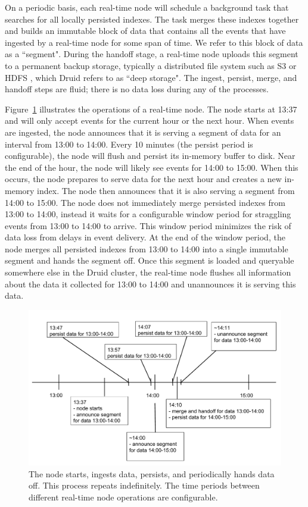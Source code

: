 \documentclass{sig-alternate-2013}
\begin{document}
On a periodic basis, each real-time node will schedule a background task that
searches for all locally persisted indexes. The task merges these indexes
together and builds an immutable block of data that contains all the events
that have ingested by a real-time node for some span of time. We refer to this
block of data as a ``segment". During the handoff stage, a real-time node
uploads this segment to a permanent backup storage, typically a distributed
file system such as S3 \cite{decandia2007dynamo} or HDFS
\cite{shvachko2010hadoop}, which Druid refers to as ``deep storage". The ingest,
persist, merge, and handoff steps are fluid; there is no data loss during any
of the processes.

Figure~\ref{fig:realtime_timeline} illustrates the operations of a real-time
node. The node starts at 13:37 and will only accept events for the current hour
or the next hour. When events are ingested, the node announces that it is
serving a segment of data for an interval from 13:00 to 14:00.  Every 10
minutes (the persist period is configurable), the node will flush and persist
its in-memory buffer to disk.  Near the end of the hour, the node will likely
see events for 14:00 to 15:00. When this occurs, the node prepares to serve
data for the next hour and creates a new in-memory index. The node then
announces that it is also serving a segment from 14:00 to 15:00.  The node does
not immediately merge persisted indexes from 13:00 to 14:00, instead it waits
for a configurable window period for straggling events from 13:00 to 14:00 to
arrive. This window period minimizes the risk of data loss from delays in event
delivery. At the end of the window period, the node merges all persisted
indexes from 13:00 to 14:00 into a single immutable segment and hands the
segment off.  Once this segment is loaded and queryable somewhere else in the
Druid cluster, the real-time node flushes all information about the data it
collected for 13:00 to 14:00 and unannounces it is serving this data. 

\begin{figure}
\centering
\includegraphics[width = 4.5in]{realtime_timeline}
\caption{The node starts, ingests data, persists, and periodically hands data
off. This process repeats indefinitely. The time periods between different
real-time node operations are configurable.}
\label{fig:realtime_timeline}
\end{figure}
\end{document}
